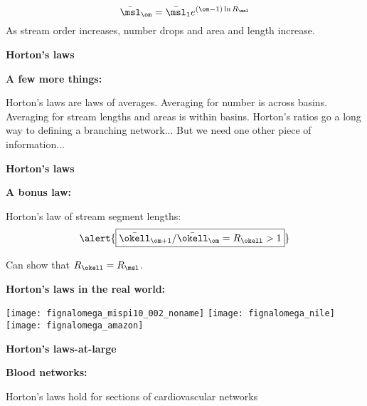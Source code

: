 \begin{frame}[label=]
\begin{frame}[label=]
\begin{frame}[label=]
\begin{frame}[label=]
\begin{frame}[label=]
\begin{frame}[label=]
\begin{frame}[label=]
\begin{frame}[label=]
\begin{frame}[label=]
\begin{frame}[label=]
\begin{frame}[label=]
\begin{frame}[label=]
\begin{frame}[label=]
\begin{frame}[label=]
\begin{columns}[b]
\begin{frame}[label=]
\begin{frame}[label=]
\begin{frame}[label=]
\begin{frame}[label=]
\begin{frame}[label=]
\begin{frame}[label=]
\begin{frame}[label=]
\begin{frame}[label=]
      $$
      \bar{\msl}_\om = \bar{\msl}_1 e^{(\om-1)\ln R_\msl}
      $$
     As stream order increases, \alert{number drops} and
      \alert{area and length increase}.
    
  


  
\begin{frame}[label=]
  \textbf{Horton's laws}

  \textbf{A few more things:}
    
     Horton's laws are laws of averages.
     Averaging for number is \alert{across} basins.
     Averaging for stream lengths and areas is \alert{within} basins.
     Horton's ratios go a long way to defining a branching network...
     But we need one other piece of information... 
    
  



\begin{frame}[label=]
  \textbf{Horton's laws}

  \textbf{A bonus law:}
    
     
      Horton's law of stream segment lengths:
      $$
      \alert{\boxed{\bar{\okell}_{\om+1}/\bar{\okell}_{\om} = R_\okell > 1}}
      $$
     
      Can show that $R_\okell = R_\msl$.
    
    
  


\begin{frame}[label=]
  \textbf{Horton's laws in the real world:}

  \begin{center}
    \texttt{[image: fignalomega\_mispi10\_002\_noname]} 
    \texttt{[image: fignalomega\_nile]} \\
    \texttt{[image: fignalomega\_amazon]} 
  \end{center}



\begin{frame}[label=]
  \textbf{Horton's laws-at-large}
  
  \textbf{Blood networks:}
    
    
      Horton's laws hold for sections
      of cardiovascular networks
    

\end{frame}
\end{frame}
\end{frame}
\end{frame}
\end{frame}
\end{frame}
\end{frame}
\end{frame}
\end{frame}
\end{frame}
\end{frame}
\end{frame}
\end{columns}
\end{frame}
\end{frame}
\end{frame}
\end{frame}
\end{frame}
\end{frame}
\end{frame}
\end{frame}
\end{frame}
\end{frame}
\end{frame}
\end{frame}
\end{frame}
\end{frame}
